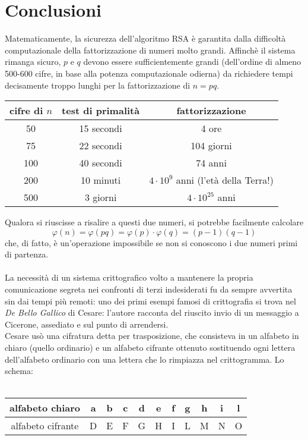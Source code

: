 \section{Conclusioni}
Matematicamente, la sicurezza dell'algoritmo RSA è garantita dalla difficoltà computazionale della fattorizzazione di numeri molto grandi. Affinchè il sistema rimanga sicuro, $p$ e $q$ devono essere sufficientemente grandi (dell'ordine di almeno 500-600 cifre, in base alla potenza computazionale odierna) da richiedere tempi decisamente troppo lunghi per la fattorizzazione di $n=pq$.
\begin{center}
{\renewcommand\arraystretch{1.2}
\begin{tabular}{| c | c | c |}
\hline
cifre di $n$ & test di primalità & fattorizzazione\\
\hline
50 & 15 secondi & 4 ore\\
\hline
75 & 22 secondi & 104 giorni\\
\hline
100 & 40 secondi & 74 anni\\
\hline
200 & 10 minuti & $4\cdot 10^{9}$ anni (l'età della Terra!)\\
\hline
500 & 3 giorni & $4 \cdot 10^{25}$ anni\\
\hline
\end{tabular}}
\end{center}
Qualora si riuscisse a risalire a questi due numeri, si potrebbe facilmente calcolare
\begin{equation*}
    \varphi(n)=\varphi(pq)=\varphi(p)\cdot\varphi(q)=(p-1)(q-1)
\end{equation*}
che, di fatto, è un'operazione impossibile se non si conoscono i due numeri primi di partenza.\\\\
La necessità di un sistema crittografico volto a mantenere la propria comunicazione segreta nei confronti di terzi indesiderati fu da sempre avvertita sin dai tempi più remoti: uno dei primi esempi famosi di crittografia si trova nel \emph{De Bello Gallico} di Cesare: l’autore racconta del riuscito invio di un messaggio a Cicerone, assediato e sul punto di arrendersi.\\
Cesare usò una cifratura detta per trasposizione, che consisteva in un alfabeto in chiaro (quello ordinario) e un alfabeto cifrante ottenuto sostituendo ogni lettera dell’alfabeto ordinario con una lettera che lo rimpiazza nel crittogramma. Lo schema:\\\\
\begin{tabular}{ | c | c | c | c | c | c | c | c | c | c | c | }
\hline
alfabeto chiaro & a & b & c & d & e & f & g & h & i & l \\
\hline
alfabeto cifrante & D & E & F & G & H & I & L & M & N & O \\
\hline
\end{tabular}\\
